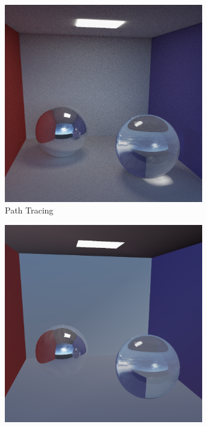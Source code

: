 	

	\begin{figure}[h]
		\begin{subfigure}[b]{0.33\textwidth}
			\center
			\includegraphics[width=0.95\textwidth]{pic/irrmap-cornell-ref.png}
			\caption{Path Tracing}
		\end{subfigure}
		\begin{subfigure}[b]{0.33\textwidth}
			\center
			\includegraphics[width=0.95\textwidth]{pic/irrmap-cornell-vmap.png}

\end{subfigure}
\end{figure}
